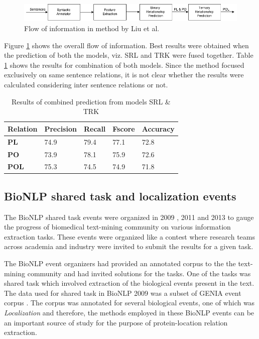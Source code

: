 \begin{figure}
\includegraphics[scale=0.5]{figures/Liu_Flow.png}
\caption{Flow of information in method by Liu et al.}\label{fig:LiuFlow}
\end{figure}

Figure \ref{fig:LiuFlow} shows the overall flow of information. Best results were obtained when the prediction of both the models, viz. SRL and TRK were fused together. Table \ref{tab:LiuRes} shows the results for combination of both models. Since the method focused exclusively on same sentence relations, it is not clear whether the results were calculated considering inter sentence relations or not.

\begin{table}
\centering
\begin{tabular}{|l|l|l|l|l|}
\hline
\textbf{Relation} & \textbf{Precision} & \textbf{Recall} & \textbf{Fscore} & \textbf{Accuracy} \\ \hline
\textbf{PL} & 74.9 & 79.4 & 77.1 & 72.8 \\
\textbf{PO} & 73.9 & 78.1 & 75.9 & 72.6 \\
\textbf{POL} & 75.3 & 74.5 & 74.9 &  71.8\\ \hline
\end{tabular}
\caption{Results of combined prediction from models SRL \& TRK}\label{tab:LiuRes}
\end{table}

\subsection{BioNLP shared task and localization events}

The BioNLP shared task events were organized in 2009 \cite{kim2009overview}, 2011 and 2013 to gauge the progress of biomedical text-mining community on various information extraction tasks. These events were organized like a contest where research teams across academia and industry were invited to submit the results for a given task. 

The BioNLP event organizers had provided an annotated corpus to the the text-mining community and had invited solutions for the tasks. One of the tasks was shared task which involved extraction of the biological events present in the text. The data used for shared task in BioNLP 2009 was a subset of GENIA event corpus \cite{kim2008corpus}. The corpus was annotated for several biological events, one of which was \textit{Localization} and therefore, the methods employed in these BioNLP events can be an important source of study for the purpose of protein-location relation extraction.

